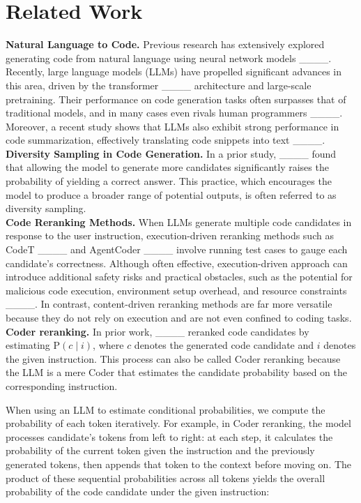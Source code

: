\section{Related Work}
\label{sec:background}
\textbf{Natural Language to Code.} 
Previous research has extensively explored generating code from natural language using neural network models ____. Recently, large language models (LLMs) have propelled significant advances in this area, driven by the transformer ____ architecture and large-scale pretraining. Their performance on code generation tasks often surpasses that of traditional models, and in many cases even rivals human programmers ____. Moreover, a recent study shows that LLMs also exhibit strong performance in code summarization, effectively translating code snippets into text ____.\\

\noindent\textbf{Diversity Sampling in Code Generation.} In a prior study, ____ found  that allowing the model to generate more candidates significantly raises the probability of yielding a correct answer. This practice, which encourages the model to produce a broader range of potential outputs, is often referred to as diversity sampling.\\

\noindent\textbf{Code Reranking Methods.} When LLMs generate multiple code candidates in response to the user instruction, execution-driven reranking methods 
such as CodeT ____ and AgentCoder ____ involve running test cases to gauge each candidate’s correctness. Although often effective, execution-driven approach can introduce additional safety risks and practical obstacles, such as the potential for malicious code execution, environment setup overhead, and resource constraints ____. In contrast, content-driven reranking methods are far more versatile because they do not rely on execution and are not even confined to coding tasks.\\

\noindent\textbf{Coder reranking.} In prior work, ____ reranked code candidates by estimating \(\text{P}(c \mid i) \), where \( c \) denotes the generated code candidate and \( i \) denotes the given instruction. This process can also be called Coder reranking because the LLM is a mere Coder that estimates the candidate probability based on the corresponding instruction.

When using an LLM to estimate conditional probabilities, we compute the probability of each token iteratively. For example, in Coder reranking, the model processes candidate's tokens from left to right: at each step, it calculates the probability of the current token given the instruction and the previously generated tokens, then appends that token to the context before moving on. The product of these sequential probabilities across all tokens yields the overall probability of the code candidate under the given instruction:


